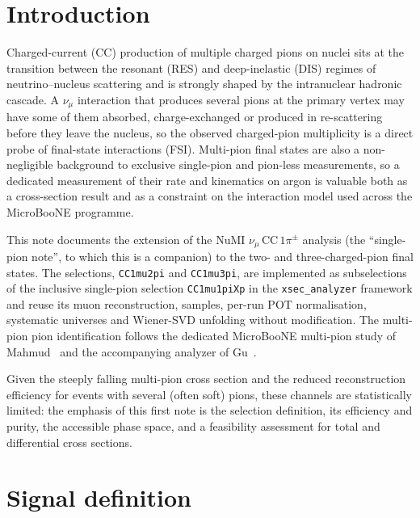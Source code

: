 \documentclass[11pt,a4paper]{article}
\newcommand{\uboone}{MicroBooNE}
\begin{document}
\tableofcontents
\newpage

\section{Introduction}
\label{sec:intro}

Charged-current (CC) production of multiple charged pions on nuclei sits at the
transition between the resonant (RES) and deep-inelastic (DIS) regimes of
neutrino--nucleus scattering and is strongly shaped by the intranuclear hadronic
cascade. A $\nu_\mu$ interaction that produces several pions at the primary vertex may
have some of them absorbed, charge-exchanged or produced in re-scattering before they
leave the nucleus, so the observed charged-pion multiplicity is a direct probe of
final-state interactions (FSI). Multi-pion final states are also a non-negligible
background to exclusive single-pion and pion-less measurements, so a dedicated
measurement of their rate and kinematics on argon is valuable both as a cross-section
result and as a constraint on the interaction model used across the \uboone{} programme.

This note documents the extension of the NuMI $\nu_\mu\,\mathrm{CC}\,1\pi^\pm$ analysis
(the ``single-pion note'', to which this is a companion) to the two- and
three-charged-pion final states. The selections, \texttt{CC1mu2pi} and
\texttt{CC1mu3pi}, are implemented as subselections of the inclusive single-pion
selection \texttt{CC1mu1piXp} in the \texttt{xsec\_analyzer} framework and reuse its
muon reconstruction, samples, per-run POT normalisation, systematic universes and
Wiener-SVD unfolding without modification. The multi-pion pion identification follows
the dedicated \uboone{} multi-pion study of
Mahmud~\cite{mahmud} and the accompanying analyzer of Gu~\cite{gu}.

Given the steeply falling multi-pion cross section and the reduced reconstruction
efficiency for events with several (often soft) pions, these channels are
statistically limited: the emphasis of this first note is the selection definition,
its efficiency and purity, the accessible phase space, and a feasibility assessment
for total and differential cross sections.

\section{Signal definition}
\label{sec:signal}
\end{document}
